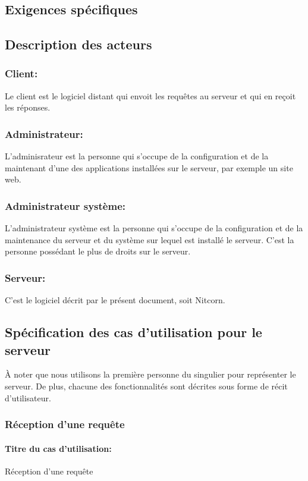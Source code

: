 \documentclass{scrreprt}
\begin{document}
\begin{itemizen}
\chapter{Exigences spécifiques}

\section{Description des acteurs}
\subsection{Client:} Le client est le logiciel distant qui envoit les requêtes au serveur et qui en reçoit les réponses. 
\subsection{Administrateur:} L'adminisrateur est la personne qui s'occupe de la configuration et de la maintenant d'une des applications installées sur le serveur, par exemple un site web.
\subsection{Administrateur système:} L'administrateur système est la personne qui s'occupe de la configuration et de la maintenance du serveur et du système sur lequel est installé le serveur. C'est la personne possédant le plus de droits sur le serveur.
\subsection{Serveur:} C'est le logiciel décrit par le présent document, soit Nitcorn.




\section{Spécification des cas d'utilisation pour le serveur} 
À noter que nous utilisons la première personne du singulier pour représenter le serveur. De plus, chacune des fonctionnalités sont décrites sous forme de récit d'utilisateur.
\subsection{Réception d'une requête}
\subsubsection{Titre du cas d'utilisation:} Réception d'une requête

\end{itemizen}
\end{document}
